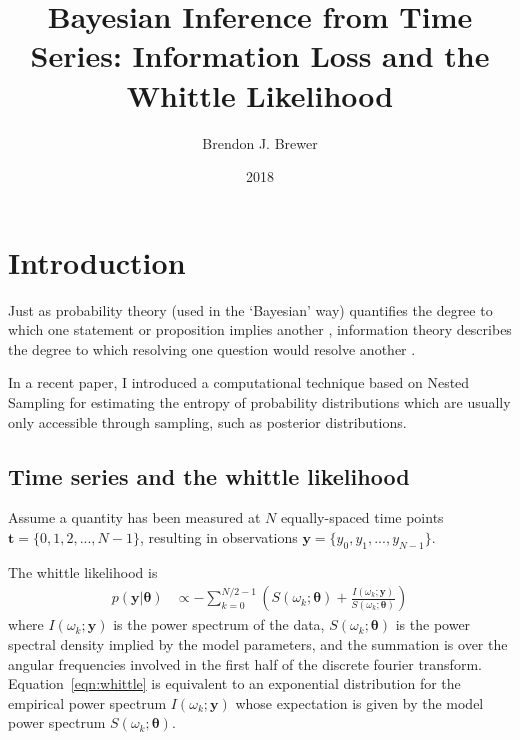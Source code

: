 \documentclass[a4paper, 12pt]{article}
\title{Bayesian Inference from Time Series: Information Loss and the Whittle Likelihood}
\author{Brendon J. Brewer}
\date{2018}
\begin{document}
\maketitle


\setlength{\parindent}{0pt}
\setlength{\parskip}{1em}

\section{Introduction}

Just as probability theory (used in the `Bayesian' way)
quantifies the degree to which one statement or
proposition implies another \citep{knuth_skilling},
information theory describes the
degree to which resolving one question would resolve another
\citep{knuth_questions, vanerp}.

In a recent paper, I introduced a computational technique based on Nested
Sampling for estimating the entropy of probability distributions which are
usually only accessible through sampling, such as posterior distributions.

\subsection{Time series and the whittle likelihood}

Assume a quantity has been measured at $N$ equally-spaced time points
$\boldsymbol{t} = \{0, 1, 2, ..., N-1\}$, resulting in observations
$\boldsymbol{y} = \{y_0, y_1, ..., y_{N-1}\}$.

The whittle likelihood is
\begin{align}
p(\boldsymbol{y} | \boldsymbol{\theta})
    &\propto -\sum_{k=0}^{N/2 - 1}
         \left(S(\omega_k; \boldsymbol{\theta})
         + \frac{I(\omega_k; \boldsymbol{y})}
                {S(\omega_k; \boldsymbol{\theta})}\right)\label{eqn:whittle}
\end{align}
where $I(\omega_k; \boldsymbol{y})$ is the power spectrum of the data,
$S(\omega_k; \boldsymbol{\theta})$ is the power spectral density implied
by the model parameters, and the summation is over the angular frequencies
involved in the first half of the discrete fourier transform.
Equation~\ref{eqn:whittle} is equivalent to an exponential distribution
for the empirical power spectrum
$I(\omega_k; \boldsymbol{y})$ whose expectation is given by the
model power spectrum $S(\omega_k; \boldsymbol{\theta})$.
\end{document}

